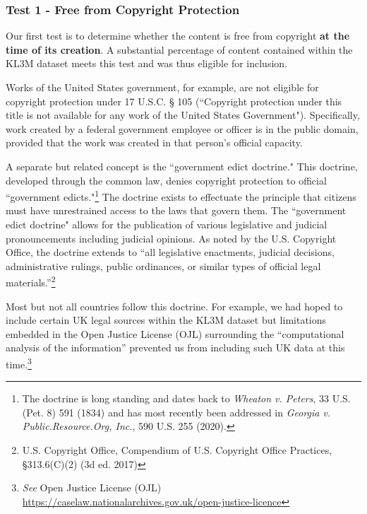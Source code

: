 \subsubsection{Test 1 - Free from Copyright Protection}
Our first test is to determine whether the content is free from copyright \textbf{at the time of its creation}. A substantial percentage of content contained within the KL3M dataset meets this test and was thus eligible for inclusion.

Works of the United States government, for example, are not eligible for copyright protection under 17 U.S.C. § 105 (``Copyright protection under this title is not available for any work of the United States Government").  Specifically, work created by a federal government employee or officer is in the public domain, provided that the work was created in that person’s official capacity. 

A separate but related concept is the ``government edict doctrine."  This doctrine, developed through the common law, denies copyright protection to official ``government edicts."\footnote{The doctrine is long standing and dates back to \textit{Wheaton v. Peters}, 33 U.S. (Pet. 8) 591 (1834) and has most recently been addressed in \textit{Georgia v. Public.Resource.Org, Inc.}, 590 U.S. 255 (2020).}  The doctrine exists to effectuate the principle that citizens must have unrestrained access to the laws that govern them.  The ``government edict doctrine" allows for the publication of various legislative and judicial pronouncements including judicial opinions.  As noted by the U.S. Copyright Office, the doctrine extends to ``all legislative enactments, judicial decisions, administrative rulings, public ordinances, or similar types of official legal materials.''\footnote{U.S. Copyright Office, Compendium of U.S. Copyright Office Practices, §313.6(C)(2) (3d ed. 2017)}

Most but not all countries follow this doctrine. For example, we had hoped to include certain UK legal sources within the KL3M dataset but limitations embedded in the Open Justice License (OJL)  surrounding the ``computational analysis of the information'' prevented us from including such UK data at this time.\footnote{\textit{See} Open Justice License (OJL) \url{https://caselaw.nationalarchives.gov.uk/open-justice-licence}} 

